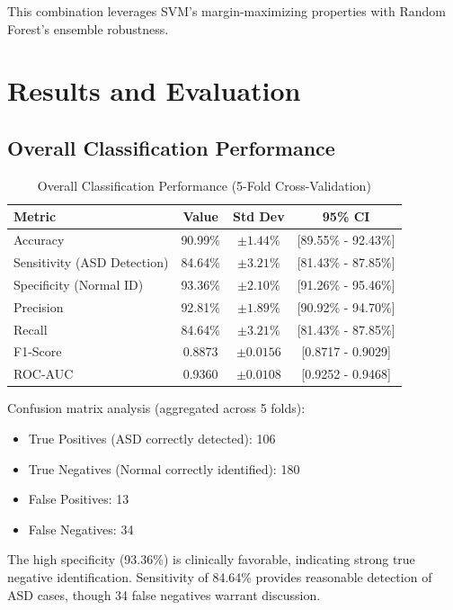 \documentclass[conference]{IEEEtran}
\begin{document}
This combination leverages SVM's margin-maximizing properties with Random Forest's ensemble robustness.

\section{Results and Evaluation}

\subsection{Overall Classification Performance}

\begin{table}[H]
\centering
\caption{Overall Classification Performance (5-Fold Cross-Validation)}
\begin{tabular}{lccc}
\toprule
\textbf{Metric} & \textbf{Value} & \textbf{Std Dev} & \textbf{95\% CI} \\
\midrule
Accuracy & 90.99\% & $\pm 1.44\%$ & [89.55\% - 92.43\%] \\
Sensitivity (ASD Detection) & 84.64\% & $\pm 3.21\%$ & [81.43\% - 87.85\%] \\
Specificity (Normal ID) & 93.36\% & $\pm 2.10\%$ & [91.26\% - 95.46\%] \\
Precision & 92.81\% & $\pm 1.89\%$ & [90.92\% - 94.70\%] \\
Recall & 84.64\% & $\pm 3.21\%$ & [81.43\% - 87.85\%] \\
F1-Score & 0.8873 & $\pm 0.0156$ & [0.8717 - 0.9029] \\
ROC-AUC & 0.9360 & $\pm 0.0108$ & [0.9252 - 0.9468] \\
\bottomrule
\end{tabular}
\label{tab:overall_perf}
\end{table}

Confusion matrix analysis (aggregated across 5 folds):
\begin{itemize}
\item True Positives (ASD correctly detected): 106
\item True Negatives (Normal correctly identified): 180
\item False Positives: 13
\item False Negatives: 34
\end{itemize}

The high specificity (93.36\%) is clinically favorable, indicating strong true negative identification. Sensitivity of 84.64\% provides reasonable detection of ASD cases, though 34 false negatives warrant discussion.
\end{document}
